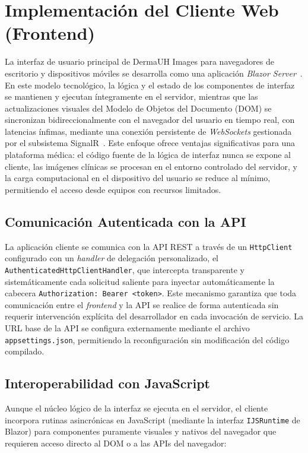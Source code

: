 \section{Implementación del Cliente Web (Frontend)}
La interfaz de usuario principal de DermaUH Images para navegadores de escritorio y dispositivos móviles se 
desarrolla como una aplicación \textit{Blazor Server}~\cite{blazor_docs}. En este modelo tecnológico, la 
lógica y el estado de los componentes de interfaz se mantienen y ejecutan íntegramente en el servidor, 
mientras que las actualizaciones visuales del Modelo de Objetos del Documento (DOM) se sincronizan 
bidireccionalmente con el navegador del usuario en tiempo real, con latencias ínfimas, mediante una 
conexión persistente de \textit{WebSockets} gestionada por el subsistema SignalR~\cite{signalr_docs}. 
Este enfoque ofrece ventajas significativas para una plataforma médica: el código fuente de la lógica 
de interfaz nunca se expone al cliente, las imágenes clínicas se procesan en el entorno controlado del 
servidor, y la carga computacional en el dispositivo del usuario se reduce al mínimo, permitiendo el 
acceso desde equipos con recursos limitados.

\subsection{Comunicación Autenticada con la API}
La aplicación cliente se comunica con la API REST a través de un 
\texttt{HttpClient}~\cite{dotnet_httpclient_docs} configurado con un \textit{handler} de delegación 
personalizado, el \texttt{AuthenticatedHttpClientHandler}, que intercepta transparente y sistemáticamente 
cada solicitud saliente para inyectar automáticamente la cabecera \texttt{Authorization: Bearer <token>}. 
Este mecanismo garantiza que toda comunicación entre el \textit{frontend} y la API se realice de forma 
autenticada sin requerir intervención explícita del desarrollador en cada invocación de servicio. 
La URL base de la API se configura externamente mediante el archivo \texttt{appsettings.json}, 
permitiendo la reconfiguración sin modificación del código compilado.

\subsection{Interoperabilidad con JavaScript}
Aunque el núcleo lógico de la interfaz se ejecuta en el servidor, el cliente incorpora rutinas asincrónicas 
en JavaScript (mediante la interfaz \texttt{IJSRuntime} de Blazor) para componentes puramente visuales y 
nativos del navegador que requieren acceso directo al DOM o a las APIs del navegador:

